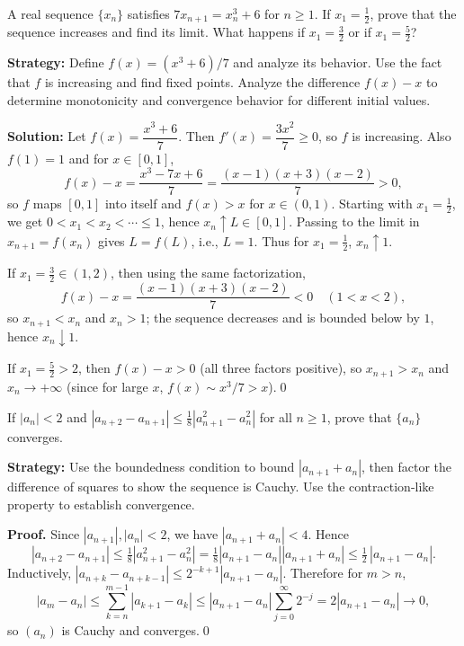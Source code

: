 \begin{problembox}
A real sequence $\{x_n\}$ satisfies $7x_{n+1} = x_n^3 + 6$ for $n \geq 1$. If $x_1 = \frac{1}{2}$, prove that the sequence increases and find its limit. What happens if $x_1 = \frac{3}{2}$ or if $x_1 = \frac{5}{2}$?
\end{problembox}

\noindent\textbf{Strategy:} Define $f(x) = (x^3 + 6)/7$ and analyze its behavior. Use the fact that $f$ is increasing and find fixed points. Analyze the difference $f(x) - x$ to determine monotonicity and convergence behavior for different initial values.

\bigskip\noindent\textbf{Solution:}
Let $f(x)=\dfrac{x^3+6}{7}$. Then $f'(x)=\dfrac{3x^2}{7}\ge 0$, so $f$ is increasing. Also $f(1)=1$ and for $x\in[0,1]$,
\[
f(x)-x=\frac{x^3-7x+6}{7}=\frac{(x-1)(x+3)(x-2)}{7}>0,
\]
so $f$ maps $[0,1]$ into itself and $f(x)>x$ for $x\in(0,1)$. Starting with $x_1=\tfrac12$, we get $0<x_1<x_2<\cdots\le 1$, hence $x_n\uparrow L\in[0,1]$. Passing to the limit in $x_{n+1}=f(x_n)$ gives $L=f(L)$, i.e., $L=\textbf{$1$}$. Thus for $x_1=\tfrac12$, $x_n\uparrow \textbf{$1$}$.

If $x_1=\tfrac32\in(1,2)$, then using the same factorization,
\[
f(x)-x=\frac{(x-1)(x+3)(x-2)}{7}<0\quad(1<x<2),
\]
so $x_{n+1}<x_n$ and $x_n>1$; the sequence decreases and is bounded below by $1$, hence $x_n\downarrow \textbf{$1$}$.

If $x_1=\tfrac52>2$, then $f(x)-x>0$ (all three factors positive), so $x_{n+1}>x_n$ and $x_n\to+\infty$ (since for large $x$, $f(x)\sim x^3/7>x$).\qed



\begin{problembox}
If $|a_n| < 2$ and $|a_{n+2} - a_{n+1}| \leq \frac{1}{8} |a_{n+1}^2 - a_n^2|$ for all $n \geq 1$, prove that $\{a_n\}$ converges.
\end{problembox}

\noindent\textbf{Strategy:} Use the boundedness condition to bound $|a_{n+1} + a_n|$, then factor the difference of squares to show the sequence is Cauchy. Use the contraction-like property to establish convergence.

\noindent\textbf{Proof.}
Since $|a_{n+1}|,|a_n|<2$, we have $|a_{n+1}+a_n|<4$. Hence
\[
|a_{n+2}-a_{n+1}|\le\tfrac18|a_{n+1}^2-a_n^2|=\tfrac18|a_{n+1}-a_n||a_{n+1}+a_n|
\le \tfrac12\,|a_{n+1}-a_n|.
\]
Inductively, $|a_{n+k}-a_{n+k-1}|\le 2^{-k+1}|a_{n+1}-a_n|$. Therefore for $m>n$,
\[
|a_m-a_n|\le \sum_{k=n}^{m-1}|a_{k+1}-a_k|\le |a_{n+1}-a_n|\sum_{j=0}^{\infty}2^{-j}=2|a_{n+1}-a_n|\to 0,
\]
so $(a_n)$ is Cauchy and converges.\qed
\medskip



